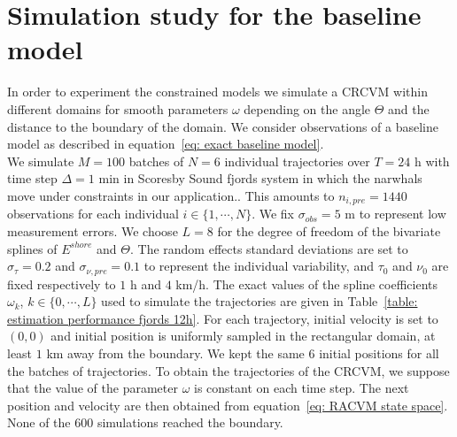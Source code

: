 \documentclass[11pt]{article}
\newcommand {\1}{\mathbb{1}}
\theoremstyle{definition}
\theoremstyle{remark}
\theoremstyle{remark}
\begin{document}
\section{Simulation study for the baseline model}
\label{section: simulation constrained motion}
In order to experiment the constrained models we simulate a CRCVM within different domains for smooth parameters $\omega$ depending on the angle $\Theta$ and the distance to the boundary of the domain. We consider observations of a baseline model as described in equation~\ref{eq: exact baseline model}.\\


We simulate $M=100$ batches of $N=6$ individual trajectories over $T=24$ h with time step $\Delta=1$ min in Scoresby Sound fjords system in which the narwhals move under constraints in our application.. This amounts to $n_{i,pre}=1440$ observations for each individual $i \in \{1,\cdots,N\}$. We fix $\sigma_{obs}=5$ m to represent low measurement errors. 
We choose $L=8$ for the degree of freedom of the bivariate splines of $E^{shore}$ and $\Theta$. The random effects standard deviations are set to $\sigma_{\tau}=0.2$ and $\sigma_{\nu,pre}=0.1$ to represent the individual variability, and $\tau_{0}$ and $\nu_{0}$ are fixed respectively to $1$ h and $4$ km/h. The exact values of the spline coefficients $\omega_k$, $k \in \{0,\cdots,L\}$ used to simulate the trajectories are given in Table~\ref{table: estimation performance fjords 12h}. For each trajectory, initial velocity is set to $(0,0)$ and initial position is uniformly sampled in the rectangular domain, at least $1$ km away from the boundary. We kept the same $6$ initial positions for all the batches of trajectories. To obtain the trajectories of the CRCVM, we suppose that the value of the parameter $\omega$ is constant on each time step. The next position and velocity are then obtained from equation~\ref{eq: RACVM state space}. None of the $600$ simulations reached the boundary. \\

\end{document}
